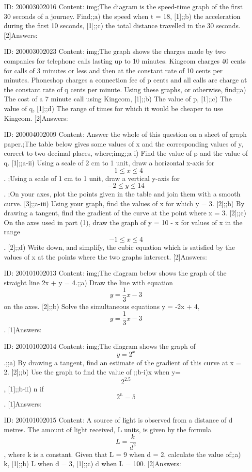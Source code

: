 \documentclass{article}
\begin{document}
ID: 200003002016
Content:
img;The diagram is the speed-time graph of the first 30 seconds of a journey. Find;;a) the speed when t = 18, [1];;b) the acceleration during the first 10 seconds, [1];;c) the total distance travelled in the 30 seconds. [2]Answers:

ID: 200003002023
Content:
img;The graph shows the charges made by two companies for telephone calls lasting up to 10 minutes. Kingcom charges 40 cents for calls of 3 minutes or less and then at the constant rate of 10 cents per minutes. Phoneshop charges a connection fee of p cents and all calls are charge at the constant rate of q cents per minute. Using these graphs, or otherwise, find;;a) The cost of a 7 minute call using Kingcom, [1];;b) The value of p, [1];;c) The value of q, [1];;d) The range of times for which it would be cheaper to use Kingcom. [2]Answers:

ID: 200004002009
Content:
Answer the whole of this question on a sheet of graph paper.;The table below gives some values of x and the corresponding values of y, correct to two decimal places, where;img;;a-i) Find the value of p and the value of q. [1];;a-ii) Using a scale of 2 cm to 1 unit, draw a horizontal x-axis for $$-1 \leq x \leq 4$$. ;Using a scale of 1 cm to 1 unit, draw a vertical y-axis for $$-2 \leq y \leq 14$$. ;On your axes, plot the points given in the table and join them with a smooth curve. [3];;a-iii) Using your graph, find the values of x for which y = 3. [2];;b) By drawing a tangent, find the gradient of the curve at the point where x = 3. [2];;c) On the axes used in part (1), draw the graph of y = 10 - x for values of x in the range $$-1 \leq x \leq 4$$. [2];;d) Write down, and simplify, the cubic equation which is satisfied by the values of x at the points where the two graphs intersect. [2]Answers:

ID: 200101002013
Content:
img;The diagram below shows the graph of the straight line 2x + y = 4.;;a) Draw the line with equation $$y=\frac{1}{3}x-3$$ on the axes. [2];;b) Solve the simultaneous equations y = -2x + 4, $$y=\frac{1}{3}x-3$$. [1]Answers:

ID: 200101002014
Content:
img;The diagram shows the graph of $$y=2^x$$.;;a) By drawing a tangent, find an estimate of the gradient of this curve at x = 2. [2];;b) Use the graph to find the value of ;;b-i)x when y= $$2^{2.5}$$, [1];;b-ii) n  if $$2^n=5$$. [1]Answers:

ID: 200101002015
Content:
A source of light is observed from a distance of d metres. The amount of light received, L units, is given by the formula $$L=\frac{k}{d^{2}}$$, where k is a constant. Given that L = 9 when d = 2, calculate the value of;;a) k, [1];;b) L when d = 3, [1];;c) d when L = 100. [2]Answers:
\end{document}
